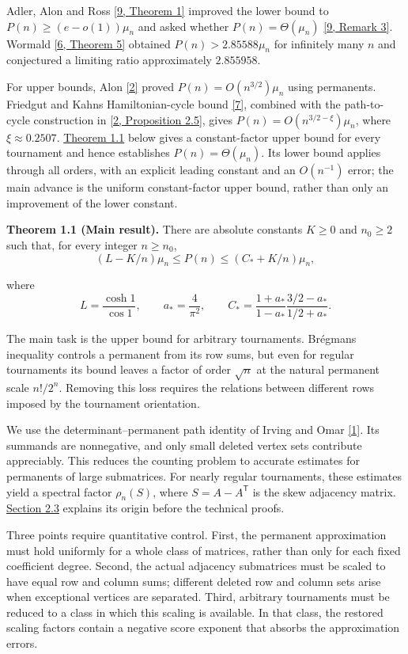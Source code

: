 \documentclass[11pt,a4paper]{article}
\makeatletter
\newcommand{\paperstatement}[3]{\par\addvspace{6pt}\Needspace{4\baselineskip}\phantomsection\def\@currentlabel{#2}\label{#3}\noindent\textbf{#1}\enspace}
\newcommand{\paperref}[2]{\hyperref[#1]{#2}}
\makeatother
\begin{document}
Adler, Alon and Ross \paperref{bib-9}{[9, Theorem 1]} improved the lower bound to \(P(n)\ge(e-o(1))\mu_n\) and asked whether \(P(n)=\Theta(\mu_n)\) \paperref{bib-9}{[9, Remark 3]}. Wormald \paperref{bib-6}{[6, Theorem 5]} obtained \(P(n)>2.85588\mu_n\) for infinitely many \(n\) and conjectured a limiting ratio approximately \(2.855958\).

For upper bounds, Alon \paperref{bib-2}{[2]} proved \(P(n)=O(n^{3/2})\mu_n\) using permanents. Friedgut and Kahn\textquotesingle s Hamiltonian-cycle bound \paperref{bib-7}{[7]}, combined with the path-to-cycle construction in \paperref{bib-2}{[2, Proposition 2.5]}, gives \(P(n)=O(n^{3/2-\xi})\mu_n\), where \(\xi\approx0.2507\). \paperref{thm-1.1}{Theorem 1.1} below gives a constant-factor upper bound for every tournament and hence establishes \(P(n)=\Theta(\mu_n)\). Its lower bound applies through all orders, with an explicit leading constant and an \(O(n^{-1})\) error; the main advance is the uniform constant-factor upper bound, rather than only an improvement of the lower constant.

\paperstatement{Theorem 1.1 (Main result).}{1.1}{thm-1.1} There are absolute constants \(K\ge0\) and \(n_0\ge2\) such that, for every integer \(n\ge n_0\),
\[(L-K/n)\mu_n\le P(n)\le(C_*+K/n)\mu_n,\]

where
\[L=\frac{\cosh1}{\cos1},\qquad
a_*=\frac4{\pi^2},\qquad
C_*=\frac{1+a_*}{1-a_*}\frac{3/2-a_*}{1/2+a_*}.\]

The main task is the upper bound for arbitrary tournaments. Brégman\textquotesingle s inequality controls a permanent from its row sums, but even for regular tournaments its bound leaves a factor of order \(\sqrt n\) at the natural permanent scale \(n!/2^n\). Removing this loss requires the relations between different rows imposed by the tournament orientation.

We use the determinant--permanent path identity of Irving and Omar \paperref{bib-1}{[1]}. Its summands are nonnegative, and only small deleted vertex sets contribute appreciably. This reduces the counting problem to accurate estimates for permanents of large submatrices. For nearly regular tournaments, these estimates yield a spectral factor \(\rho_n(S)\), where \(S=A-A^{\mathsf T}\) is the skew adjacency matrix. \paperref{sec-2.3}{Section 2.3} explains its origin before the technical proofs.

Three points require quantitative control. First, the permanent approximation must hold uniformly for a whole class of matrices, rather than only for each fixed coefficient degree. Second, the actual adjacency submatrices must be scaled to have equal row and column sums; different deleted row and column sets arise when exceptional vertices are separated. Third, arbitrary tournaments must be reduced to a class in which this scaling is available. In that class, the restored scaling factors contain a negative score exponent that absorbs the approximation errors.
\end{document}
